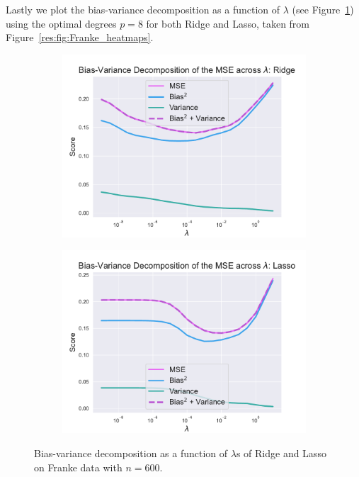 \documentclass[twocolumn,english,notitlepage]{article}
\begin{document}
            Lastly we plot the bias-variance decomposition as a function of $\lambda$ (see Figure~\ref{res:fig:bs_bias_var_lmbdas_Ridge_Lasso}) using the optimal degrees $p=8$ for both Ridge and Lasso, taken from Figure~\ref{res:fig:Franke_heatmaps}.  

            \begin{figure}[ht]
                \begin{subfigure}{\linewidth}
                    \centering
                    \includegraphics[width=.9\linewidth]{BS_bias_var_lmbdas_Ridge.pdf}
                \end{subfigure}
                \begin{subfigure}{\linewidth}
                    \centering
                    \includegraphics[width=.9\linewidth]{BS_bias_var_lmbdas_Lasso.pdf}
                \end{subfigure}
                \caption{Bias-variance decomposition as a function of $\lambda$s of Ridge and Lasso on Franke data with $n=600$.}
                \label{res:fig:bs_bias_var_lmbdas_Ridge_Lasso}
            \end{figure}
\end{document}
